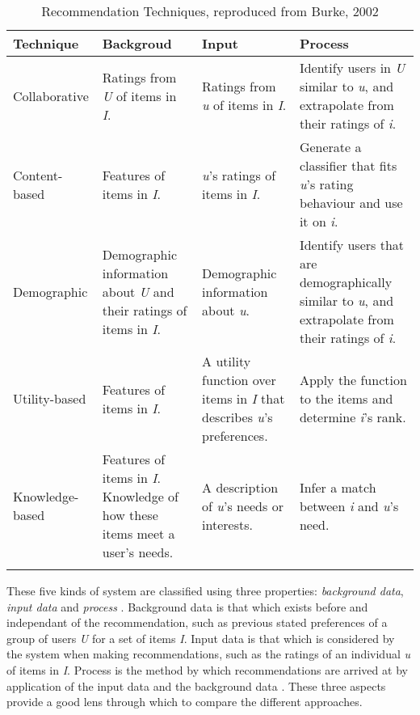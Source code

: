 \begin{table}[ht]
    \caption{Recommendation Techniques, reproduced from Burke, 2002 \cite{Burke02}}
    \centering
    \begin{tabular}{p{2.5cm} p{3.5cm} p{3.5cm} p{3.5cm}}
        Technique & Backgroud & Input & Process
        \\\hline\hline
        Collaborative & Ratings from \textit{U} of items in \textit{I}. & Ratings from \textit{u} of items in \textit{I}. & Identify users in \textit{U} similar to \textit{u}, and extrapolate from their ratings of \textit{i}. \\
        Content-based & Features of items in \textit{I}. & \textit{u}'s ratings of items in \textit{I}. & Generate a classifier that fits \textit{u}'s rating behaviour and use it on \textit{i}. \\ 
        Demographic & Demographic information about \textit{U} and their ratings of items in \textit{I}. & Demographic information about \textit{u}. & Identify users that are demographically similar to \textit{u}, and extrapolate from their ratings of \textit{i}. \\
        Utility-based & Features of items in \textit{I}. & A utility function over items in \textit{I} that describes \textit{u}'s preferences. & Apply the function to the items and determine \textit{i}'s rank. \\
        Knowledge-based & Features of items in \textit{I}. Knowledge of how these items meet a user's needs. & A description of \textit{u}'s needs or interests. & Infer a match between \textit{i} and \textit{u}'s need. \\
        \\\hline
    \end{tabular}
    \label{table:burke02}
\end{table}

These five kinds of system are classified using three properties: \textit{background data}, \textit{input data} and \textit{process} \cite{Burke02}. Background data is that which exists before and independant of the recommendation, such as previous stated preferences of a group of users \textit{U} for a set of items \textit{I}. Input data is that which is considered by the system when making recommendations, such as the ratings of an individual \textit{u} of items in \textit{I}. Process is the method by which recommendations are arrived at by application of the input data and the background data \cite{Burke02}. These three aspects provide a good lens through which to compare the different approaches.

